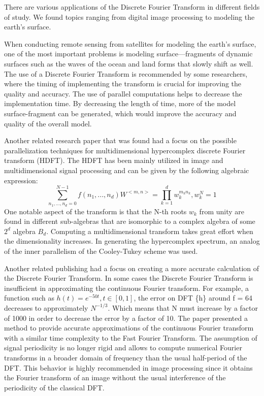 \documentclass[journal]{IEEEtran}
\begin{document}
	\par{
		There are various applications of the Discrete Fourier Transform in different fields of study. We found topics ranging from digital 
		image processing to modeling the earth's surface.
	}
	\par{
		When conducting remote sensing from satellites for modeling the earth's surface, one of the most important problems is 
		modeling surface—fragments of dynamic surfaces such as the waves of the ocean and land forms that slowly shift as well. 
		The use of a Discrete Fourier Transform is recommended by some researchers, where the timing of implementing the transform 
		is crucial for improving the quality and accuracy. The use of parallel computations helps to decrease the implementation time. 
		By decreasing the length of time, more of the model surface-fragment can be generated, which would improve the accuracy and 
		quality of the overall model.
	}
	\cite{book:GIS}
	\par{
		Another related research paper that was found had a focus on the possible parallelization techniques for multidimensional 
		hypercomplex discrete Fourier transform (HDFT). The HDFT has been mainly utilized in image and multidimensional signal 
		processing and can be given by the following algebraic expression:
		\[ \sum_{n_1,...,n_d=0}^{N-1} f(n_1,...,n_d)W^{<m,n>} = \prod_{k=1}^{d} w_k^{m_kn_k}, w_k^{N} = 1\]
		One notable aspect of the transform is that the N-th roots $w_{k}$ from unity are found in different sub-algebras that are 
		isomorphic to a complex algebra of some $2^{d}$ algebra $B_{d}$. Computing a multidimensional transform takes great effort 
		when the dimensionality increases. In generating the hypercomplex spectrum, an analog of the inner parallelism of the 
		Cooley-Tukey scheme was used.
	}
	\cite{Chicheva}
	\par{
		Another related publishing had a focus on creating a more accurate calculation of the Discrete Fourier Transform. 
		In some cases the Discrete Fourier Transform is insufficient in approximating the continuous Fourier transform. 
		For example, a function such as $h (t) = e^{-50t}, t\in [0,1]$, the error on DFT \{h\} around f = 64 decreases 
		to approximately $N^{-1/3}$. Which means that N must increase by a factor of 1000 in order to decrease the error 
		by a factor of 10. The paper presented a method to provide accurate approximations of the continuous Fourier 
		transform with a similar time complexity to the Fast Fourier Transform. The assumption of signal periodicity 
		is no longer rigid and allows to compute numerical Fourier transforms in a broader domain of frequency than the 
		usual half-period of the DFT. This behavior is highly recommended in image processing since it obtains the Fourier 
		transform of an image without the usual interference of the periodicity of the classical DFT.
	}
\end{document}
